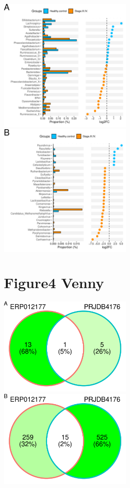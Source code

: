 \documentclass[
]{article}
\begin{document}
\includegraphics[width=0.5\textwidth,height=0.5\textheight]{../../Analysis_shotgun_PRJDB4176/04_Wilcoxon/atlas/output/class_PRJDB4176_pvalue0.05Stage.III.IV._Healthy.control_metagenomics.png}
\includegraphics[width=0.5\textwidth,height=0.5\textheight]{../../Analysis_shotgun_PRJDB4176/04_Wilcoxon/Kraken2/output/class_PRJDB4176_pvalue0.05Stage.III.IV._Healthy.control_metagenomics.png}

\hypertarget{figure4-venny}{%
\section{Figure4 Venny}\label{figure4-venny}}

\includegraphics[width=0.5\textwidth,height=0.5\textheight]{../../Venny/Atlas_wilcox_venny.png}
\includegraphics[width=0.5\textwidth,height=0.5\textheight]{../../Venny/Kraken2_wilcox_venny.png}
\end{document}
